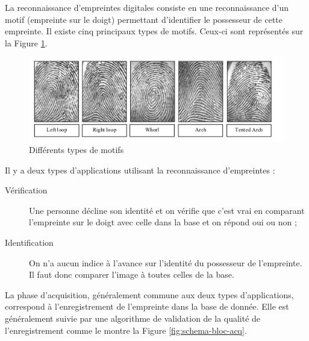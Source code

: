 La reconnaissance d'empreintes digitales consiste en une
reconnaissance d'un motif (empreinte sur le doigt) permettant
d'identifier le possesseur de cette empreinte. Il existe cinq
principaux types de motifs. Ceux-ci sont représentés sur la Figure
\ref{fig:motifs}.

\begin{figure}[H]
  \centering
  \includegraphics[scale=0.7]{./kinds.png}
  \caption{Différents types de motifs}
  \label{fig:motifs}
\end{figure}



Il y a deux types d'applications utilisant la reconnaissance
d'empreintes :

\begin{description}
\item[Vérification] Une personne décline son identité et on vérifie
  que c'est vrai en comparant l'empreinte sur le doigt avec celle dans
  la base et on répond oui ou non ;
\item[Identification] On n'a aucun indice à l'avance sur l'identité du
  possesseur de l'empreinte. Il faut donc comparer l'image à toutes
  celles de la base.
\end{description}

La phase d'acquisition, généralement commune aux deux types
d'applications, correspond à l'enregistrement de l'empreinte dans la
base de donnée. Elle est généralement suivie par une algorithme de
validation de la qualité de l'enregistrement comme le montre la Figure
\ref{fig:schema-bloc-acq}.


